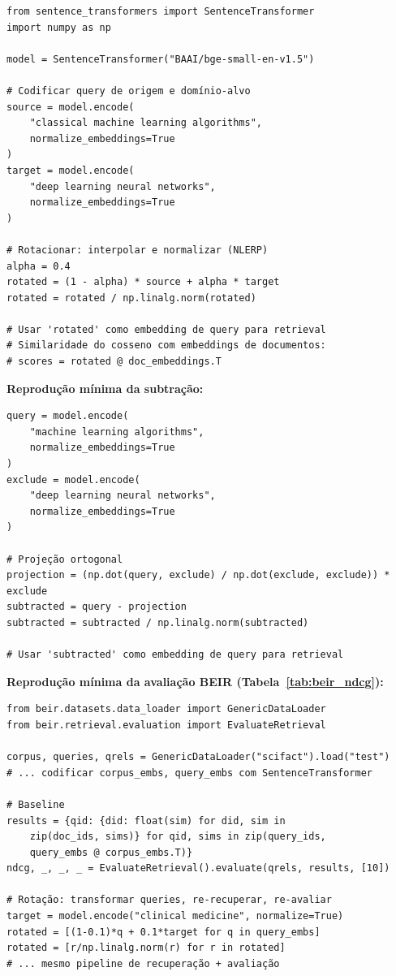 \documentclass{article}
\begin{document}
\begin{Verbatim}[fontsize=\small]
from sentence_transformers import SentenceTransformer
import numpy as np

model = SentenceTransformer("BAAI/bge-small-en-v1.5")

# Codificar query de origem e domínio-alvo
source = model.encode(
    "classical machine learning algorithms",
    normalize_embeddings=True
)
target = model.encode(
    "deep learning neural networks",
    normalize_embeddings=True
)

# Rotacionar: interpolar e normalizar (NLERP)
alpha = 0.4
rotated = (1 - alpha) * source + alpha * target
rotated = rotated / np.linalg.norm(rotated)

# Usar 'rotated' como embedding de query para retrieval
# Similaridade do cosseno com embeddings de documentos:
# scores = rotated @ doc_embeddings.T
\end{Verbatim}

\textbf{Reprodução mínima da subtração:}

\begin{Verbatim}[fontsize=\small]
query = model.encode(
    "machine learning algorithms",
    normalize_embeddings=True
)
exclude = model.encode(
    "deep learning neural networks",
    normalize_embeddings=True
)

# Projeção ortogonal
projection = (np.dot(query, exclude) / np.dot(exclude, exclude)) * exclude
subtracted = query - projection
subtracted = subtracted / np.linalg.norm(subtracted)

# Usar 'subtracted' como embedding de query para retrieval
\end{Verbatim}

\textbf{Reprodução mínima da avaliação BEIR (Tabela~\ref{tab:beir_ndcg}):}

\begin{Verbatim}[fontsize=\small]
from beir.datasets.data_loader import GenericDataLoader
from beir.retrieval.evaluation import EvaluateRetrieval

corpus, queries, qrels = GenericDataLoader("scifact").load("test")
# ... codificar corpus_embs, query_embs com SentenceTransformer

# Baseline
results = {qid: {did: float(sim) for did, sim in
    zip(doc_ids, sims)} for qid, sims in zip(query_ids,
    query_embs @ corpus_embs.T)}
ndcg, _, _, _ = EvaluateRetrieval().evaluate(qrels, results, [10])

# Rotação: transformar queries, re-recuperar, re-avaliar
target = model.encode("clinical medicine", normalize=True)
rotated = [(1-0.1)*q + 0.1*target for q in query_embs]
rotated = [r/np.linalg.norm(r) for r in rotated]
# ... mesmo pipeline de recuperação + avaliação
\end{Verbatim}
\end{document}
